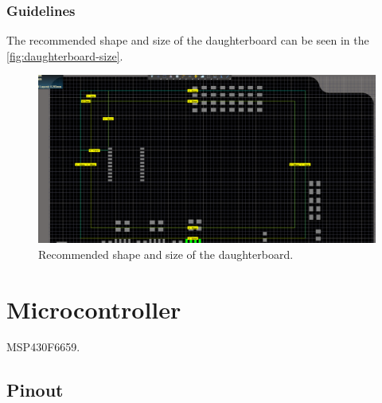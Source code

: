 \subsubsection{Guidelines}

The recommended shape and size of the daughterboard can be seen in the \autoref{fig:daughterboard-size}.

\begin{figure}[!ht]
    \begin{center}
        \includegraphics[width=\textwidth]{figures/daughterboard_size.png}
        \caption{Recommended shape and size of the daughterboard.}
        \label{fig:daughterboard-size}
    \end{center}
\end{figure}

\section{Microcontroller}

MSP430F6659.

\subsection{Pinout}

